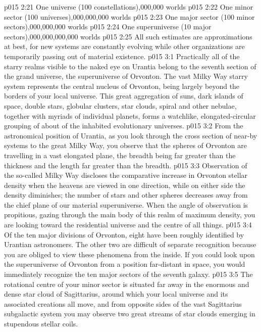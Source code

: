 \vs p015 2:21 One universe (100 constellations),000,000 worlds
\vs p015 2:22 One minor sector (100 universes),000,000,000 worlds
\vs p015 2:23 One major sector (100 minor sectors),000,000,000 worlds
\vs p015 2:24 One superuniverse (10 major sectors),000,000,000,000 worlds
\vs p015 2:25 \pc All such estimates are approximations at best, for new systems are constantly evolving while other organizations are temporarily passing out of material existence.
\vs p015 3:1 Practically all of the starry realms visible to the naked eye on Urantia belong to the seventh section of the grand universe, the superuniverse of Orvonton. The vast Milky Way starry system represents the central nucleus of Orvonton, being largely beyond the borders of your local universe. This great aggregation of suns, dark islands of space, double stars, globular clusters, star clouds, spiral and other nebulae, together with myriads of individual planets, forms a watchlike, elongated\hyp{}circular grouping of about  of the inhabited evolutionary universes.
\vs p015 3:2 From the astronomical position of Urantia, as you look through the cross section of near\hyp{}by systems to the great Milky Way, you observe that the spheres of Orvonton are travelling in a vast elongated plane, the breadth being far greater than the thickness and the length far greater than the breadth.
\vs p015 3:3 Observation of the so\hyp{}called Milky Way discloses the comparative increase in Orvonton stellar density when the heavens are viewed in one direction, while on either side the density diminishes; the number of stars and other spheres decreases away from the chief plane of our material superuniverse. When the angle of observation is propitious, gazing through the main body of this realm of maximum density, you are looking toward the residential universe and the centre of all things.
\vs p015 3:4 \pc Of the ten major divisions of Orvonton, eight have been roughly identified by Urantian astronomers. The other two are difficult of separate recognition because you are obliged to view these phenomena from the inside. If you could look upon the superuniverse of Orvonton from a position far\hyp{}distant in space, you would immediately recognize the ten major sectors of the seventh galaxy.
\vs p015 3:5 The rotational centre of your minor sector is situated far away in the enormous and dense star cloud of Sagittarius, around which your local universe and its associated creations all move, and from opposite sides of the vast Sagittarius subgalactic system you may observe two great streams of star clouds emerging in stupendous stellar coils.
